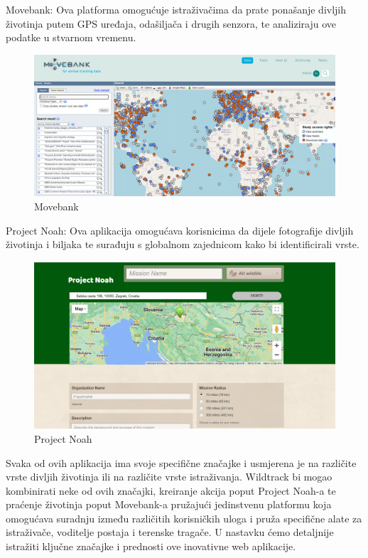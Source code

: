 \begin{packed_item}
			Movebank: Ova platforma omogućuje istraživačima da prate ponašanje divljih životinja putem GPS uređaja, odašiljača i drugih senzora, te analiziraju ove podatke u stvarnom vremenu.
			\begin{figure}[H]
				\includegraphics[width=\textwidth]{slike/movebank.PNG} %
				\caption{Movebank}
				\label{fig:movebank} %
			\end{figure}
			\item Project Noah: Ova aplikacija omogućava korisnicima da dijele fotografije divljih životinja i biljaka te surađuju s globalnom zajednicom kako bi identificirali vrste.
			\begin{figure}[H]
				\includegraphics[width=\textwidth]{slike/projectnoah.PNG} %
				\caption{Project Noah}
				\label{fig:projectnoah} %
			\end{figure}
			
		\end{packed_item}
		
		\vspace{36pt}
		
		Svaka od ovih aplikacija ima svoje specifične značajke i usmjerena je na različite vrste divljih životinja ili na različite vrste istraživanja. Wildtrack bi mogao kombinirati neke od ovih značajki, kreiranje akcija poput Project Noah-a te praćenje životinja poput Movebank-a pružajući jedinstvenu platformu koja omogućava suradnju između različitih korisničkih uloga i pruža specifične alate za istraživače, voditelje postaja i terenske tragače. U nastavku ćemo detaljnije istražiti ključne značajke i prednosti ove inovativne web aplikacije.\newline
		

